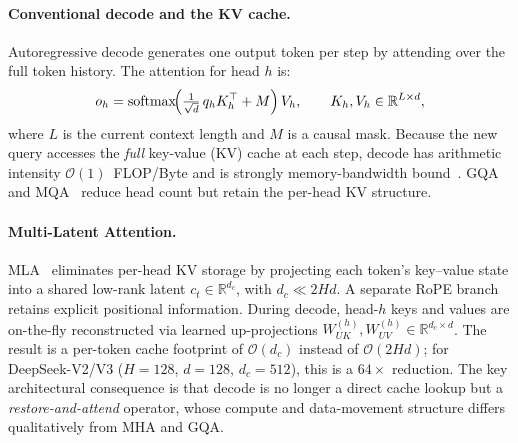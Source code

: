 \documentclass[sigconf, review, anonymous]{acmart}
\begin{document}
\paragraph{Conventional decode and the KV cache.}
Autoregressive decode generates one output token per step by attending
over the full token history.  The attention for head $h$ is:
\begin{equation}
  o_h = \mathrm{softmax}\!\Bigl(
    \tfrac{1}{\sqrt{d}}\,q_h K_h^\top + M\Bigr)\, V_h,
  \qquad K_h, V_h \in \mathbb{R}^{L \times d},
\end{equation}
where $L$ is the current context length and $M$ is a causal mask.
Because the new query accesses the \emph{full} key-value (KV) cache at
each step, decode has arithmetic intensity $\mathcal{O}(1)$~FLOP/Byte
and is strongly memory-bandwidth
bound~\cite{pope2023efficiently}.  GQA~\cite{ainslie2023gqa} and
MQA~\cite{shazeer2019mqa} reduce head count but retain the per-head KV
structure.

\paragraph{Multi-Latent Attention.}
MLA~\cite{deepseekai2024deepseekv2, deepseekai2024deepseekv3}
eliminates per-head KV storage by projecting each token's key--value
state into a shared low-rank latent $c_t \in \mathbb{R}^{d_c}$, with
$d_c \ll 2Hd$.  A separate RoPE branch~\cite{su2024roformer} retains
explicit positional information.  During decode, head-$h$ keys and
values are on-the-fly reconstructed via learned up-projections
$W_{UK}^{(h)}, W_{UV}^{(h)} \in \mathbb{R}^{d_c \times d}$.  The
result is a per-token cache footprint of $\mathcal{O}(d_c)$ instead of
$\mathcal{O}(2Hd)$; for DeepSeek-V2/V3 ($H{=}128$, $d{=}128$,
$d_c{=}512$), this is a $64\times$ reduction.  The key architectural
consequence is that decode is no longer a direct cache lookup but a
\emph{restore-and-attend} operator, whose compute and data-movement
structure differs qualitatively from MHA and GQA.
\end{document}
